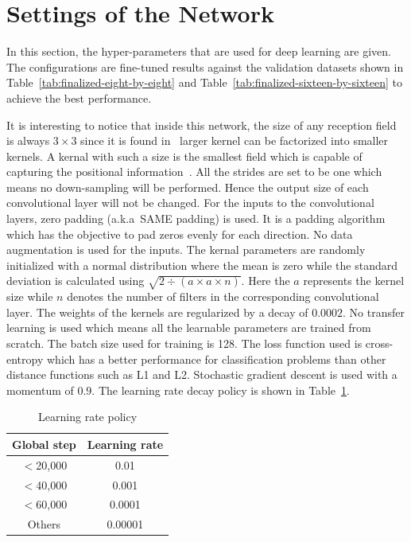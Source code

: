 \section{Settings of the Network}\label{sec:config}
In this section, the hyper-parameters that are
used for deep learning are given.
The configurations are fine-tuned results against the validation
datasets shown in Table~\ref{tab:finalized-eight-by-eight}
and Table~\ref{tab:finalized-sixteen-by-sixteen} to achieve the
best performance.

It is interesting to notice that inside this network, 
the size of any reception field
is always \(3\times3\) since it is found in~\parencite{RN62}
larger kernel can be factorized into smaller kernels.
A kernal with such a size is the smallest
field which is capable of capturing the positional
information~\parencite{RN107}.
All the strides are set to be one which means
no down-sampling will be performed. 
Hence the output size of each convolutional layer
will not be changed.
For the inputs to the convolutional layers, 
zero padding (a.k.a\ SAME padding) is used.
It is a padding algorithm which has the objective
to pad zeros evenly for each direction.
No data augmentation is used for the inputs.
The kernal parameters are randomly initialized 
with a normal distribution where the mean 
is zero while the standard deviation is 
calculated using 
\(\sqrt{2\div(\mathit{a}\times\mathit{a}\times\mathit{n})}\).
Here the \(\mathit{a}\) represents the kernel size
while \(\mathit{n}\) denotes the number of filters
in the corresponding convolutional layer.
The weights of the kernels are regularized by
a decay of \(0.0002\).
No transfer learning is used which means all the learnable 
parameters are trained from scratch.
The batch size used for training is 128.
The loss function used is cross-entropy which has
a better performance for classification problems 
than other distance functions such as L1 and L2.
Stochastic gradient descent is used with a momentum 
of \(0.9\).
The learning rate decay policy is shown in 
Table~\ref{tab:lr-policy}.

\begin{table}[H]
    \caption{Learning rate policy}
    \bigskip\label{tab:lr-policy}
    \centering
    \begin{tabular}{c c}
        \toprule
        Global step & Learning rate \\
        \midrule
        \(<\)20,000 & 0.01 \\
        \(<\)40,000 & 0.001 \\
        \(<\)60,000 & 0.0001 \\
        Others  & 0.00001 \\
        \bottomrule
    \end{tabular}
\end{table}


